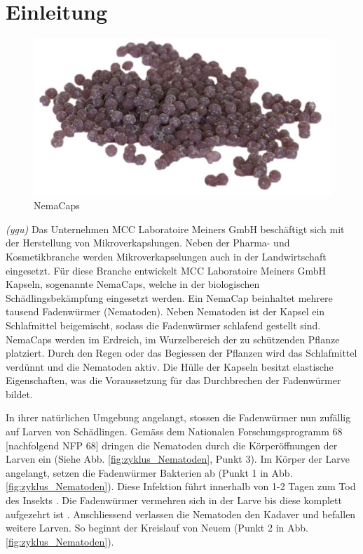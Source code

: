 \newpage
\section{Einleitung}
\begin{figure}
	\includegraphics[draft=false,scale=0.4]{Illustrationen/3-Einleitung/nemacaps_1.jpg}
	\caption{NemaCaps}
	\label{fig:nemacaps}
\end{figure}
\textit{(ygu)} Das Unternehmen MCC Laboratoire Meiners GmbH beschäftigt sich mit der Herstellung von Mikroverkapslungen. Neben der Pharma- und Kosmetikbranche werden Mikroverkapselungen auch in der Landwirtschaft eingesetzt. Für diese Branche entwickelt MCC Laboratoire Meiners GmbH Kapseln, sogenannte NemaCaps, welche in der biologischen Schädlingsbekämpfung eingesetzt werden. Ein NemaCap beinhaltet mehrere tausend Fadenwürmer (Nematoden). Neben Nematoden ist der Kapsel ein Schlafmittel beigemischt, sodass die Fadenwürmer schlafend gestellt sind. 
\newline
NemaCaps werden im Erdreich, im Wurzelbereich der zu schützenden Pflanze platziert. Durch den Regen oder das Begiessen der Pflanzen wird das Schlafmittel verdünnt und die Nematoden aktiv. Die Hülle der Kapseln besitzt elastische Eigenschaften, was die Voraussetzung für das Durchbrechen der Fadenwürmer bildet. 
\newline

In ihrer natürlichen Umgebung angelangt, stossen die Fadenwürmer nun zufällig auf Larven von Schädlingen. Gemäss dem Nationalen Forschungsprogramm 68 [nachfolgend NFP 68]\cite{nfp} dringen die Nematoden durch die Körperöffnungen der Larven ein (Siehe Abb.  \ref{fig:zyklus_Nematoden}, Punkt 3). Im Körper der Larve angelangt, setzen die Fadenwürmer Bakterien ab (Punkt 1 in Abb.  \ref{fig:zyklus_Nematoden}). Diese Infektion führt innerhalb von 1-2 Tagen zum Tod des Insekts \cite{e-nema}. Die Fadenwürmer vermehren sich in der Larve bis diese komplett aufgezehrt ist \cite{nematoden}. Anschliessend verlassen die Nematoden den Kadaver und befallen weitere Larven. So beginnt der Kreislauf von Neuem (Punkt 2 in Abb.  \ref{fig:zyklus_Nematoden}).
\newline

